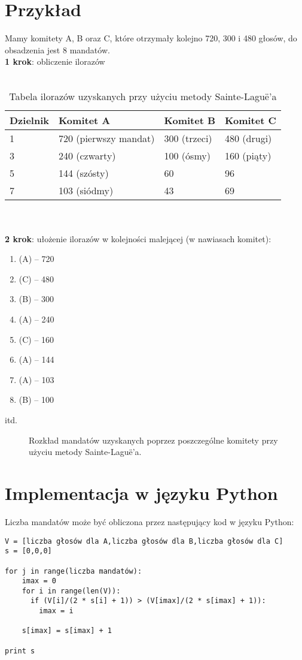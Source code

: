 \documentclass[12pt,a4paper,titlepage]{report}
\begin{document}
\section{Przykład}
Mamy komitety A, B oraz C, które otrzymały kolejno 720, 300 i 480 głosów, do obsadzenia jest 8 mandatów. \\
\textbf{1 krok}: obliczenie ilorazów \\ \\
\begin{table}[]
\begin{tabular}{|l|l|l|l|} \hline
Dzielnik & Komitet A & Komitet B & Komitet C \\
\hline
1 & 720 (pierwszy mandat) & 300 (trzeci) & 480 (drugi) \\
\hline
3 & 240 (czwarty) & 100 (ósmy) & 160 (piąty) \\
\hline
5 & 144 (szósty) & 60 & 96 \\ 
\hline
7 & 103 (siódmy) & 43 & 69 \\
\hline

\end{tabular}
\caption{Tabela ilorazów uzyskanych przy użyciu metody Sainte-Laguë'a}
\end{table}\\ \\
\textbf{2 krok}: ułożenie ilorazów w kolejności malejącej (w nawiasach komitet):
\begin{enumerate}
\item (A) – 720
\item (C) – 480
\item (B) – 300
\item (A) – 240
\item (C) – 160
\item (A) – 144
\item (A) – 103
\item (B) – 100
\end{enumerate} 
itd. 
\begin{figure} [!htbp]
\caption{Rozkład mandatów uzyskanych poprzez poszczególne komitety przy użyciu metody  Sainte-Laguë'a.}
\end{figure}
\newpage
\section{Implementacja w języku Python}
Liczba mandatów może być obliczona przez następujący kod w języku Python: 
\begin{verbatim}
V = [liczba głosów dla A,liczba głosów dla B,liczba głosów dla C]
s = [0,0,0]

for j in range(liczba mandatów):
    imax = 0
    for i in range(len(V)):
      if (V[i]/(2 * s[i] + 1)) > (V[imax]/(2 * s[imax] + 1)):
        imax = i

    s[imax] = s[imax] + 1

print s
\end{verbatim}
\newpage
\end{document}
